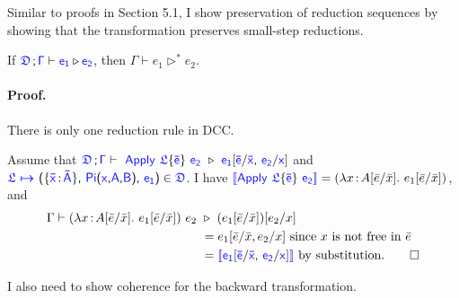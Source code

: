 Similar to proofs in Section 5.1, I show preservation of reduction sequences by showing that the transformation preserves small-step reductions.
\begin{lemma} If $\targetcon \vdash \target{e_1} \triangleright \target{e_2}$, then $\Gamma \vdash e_1 \triangleright^* e_2$.
\paragraph{Proof.} There is only one reduction rule in DCC.

Assume that 
$\targetcon \vdash \ \target{Apply\ } \target{\flabel}\{\target{\bar{e}}\}\ \target{e_2}\ \triangleright\  \target{e_1}[\target{\bar{e}} \slash \target{\bar{x}} \sfcomma \target{e_2} \slash \target{x}]$ and 
$\itemdef{\target{\flabel}}{\itemtype{\bar{x}}{\bar{A}}}{\targetpi{x}{A}{B}}{\target{e_1}} \in \target{\fdef}$.
I have $\bluebr{\target{Apply\ } \target{\flabel}\{\target{\bar{e}}\}\ \target{e_2}} = (\lam{x}{A\sub{\bar{e}}{\bar{x}}}{e_1\sub{\bar{e}}{\bar{x}}})$, and
\begin{align*}
\Gamma \vdash (\lam{x}{A\sub{\bar{e}}{\bar{x}}}{e_1\sub{\bar{e}}{\bar{x}}})\ e_2\ &\triangleright\
(e_1\sub{\bar{e}}{\bar{x}})\sub{e_2}{x}\\
&= e_1[\bar{e} \slash \bar{x}, e_2 \slash x] \text{ since $x$ is not free in $\bar{e}$}\\
&= \bluebr{\target{e_1}[\target{\bar{e}} \slash \target{\bar{x}} \sfcomma \target{e_2} \slash \target{x}]} \text{ by substitution.} \qed
\end{align*}
\label{lem:back prev sequence}
\end{lemma}

I also need to show coherence for the backward transformation.

